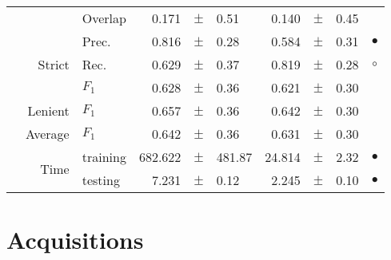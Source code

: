 \begin{longtable}{|r|r|l||rcl|rcl|c|}
\cline{3-10}
  &  &  Overlap  & 0.171 &  $\pm$  & 0.51 & 0.140 &  $\pm$  & 0.45 &  \\
\cline{2-10}
  & \multirow{3}{*}{Strict} &  Prec.  & 0.816 &  $\pm$  & 0.28 & 0.584 &  $\pm$  & 0.31 &  $\bullet$\\
\cline{3-10}
  &  &  Rec.  & 0.629 &  $\pm$  & 0.37 & 0.819 &  $\pm$  & 0.28 &  $\circ$\\
\cline{3-10}
  &  &  $F_1$  & 0.628 &  $\pm$  & 0.36 & 0.621 &  $\pm$  & 0.30 &  \\
\cline{2-10}
  & Lenient &  $F_1$  & 0.657 &  $\pm$  & 0.36 & 0.642 &  $\pm$  & 0.30 &  \\
\cline{2-10}
  & Average &  $F_1$  & 0.642 &  $\pm$  & 0.36 & 0.631 &  $\pm$  & 0.30 &  \\
\cline{2-10}
  & \multirow{2}{*}{Time} &  training  & 682.622 &  $\pm$  & 481.87 & 24.814 &  $\pm$  & 2.32 &  $\bullet$\\
\cline{3-10}
  &  &  testing  & 7.231 &  $\pm$  & 0.12 & 2.245 &  $\pm$  & 0.10 &  $\bullet$\\
\hline
\end{longtable}

\section{Acquisitions}


